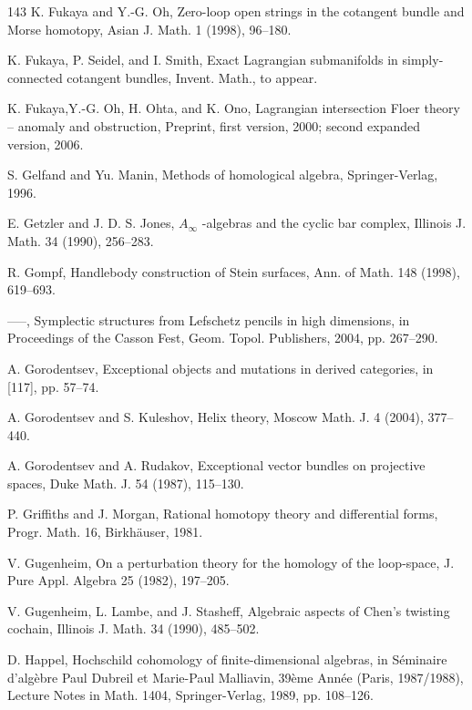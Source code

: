 \begin{thebibliography}{143}
 K. Fukaya and Y.-G. Oh, Zero-loop open strings in the cotangent bundle and Morse homotopy, Asian J. Math. 1 (1998), 96–180.

 K. Fukaya, P. Seidel, and I. Smith, Exact Lagrangian submanifolds in simply-connected cotangent bundles, Invent. Math., to appear.

 K. Fukaya,Y.-G. Oh, H. Ohta, and K. Ono, Lagrangian intersection Floer theory – anomaly and obstruction, Preprint, first version, 2000; second expanded version, 2006.

 S. Gelfand and Yu. Manin, Methods of homological algebra, Springer-Verlag, 1996.

 E. Getzler and J. D. S. Jones, \ensuremath{A_\infty} -algebras and the cyclic bar complex, Illinois J. Math. 34 (1990), 256–283.

 R. Gompf, Handlebody construction of Stein surfaces, Ann. of Math. 148 (1998), 619–693.

 —–, Symplectic structures from Lefschetz pencils in high dimensions, in Proceedings of the Casson Fest, Geom. Topol. Publishers, 2004, pp. 267–290.

 A. Gorodentsev, Exceptional objects and mutations in derived categories, in [117], pp. 57–74.

 A. Gorodentsev and S. Kuleshov, Helix theory, Moscow Math. J. 4 (2004), 377–440.

 A. Gorodentsev and A. Rudakov, Exceptional vector bundles on projective spaces, Duke Math. J. 54 (1987), 115–130.

 P. Griffiths and J. Morgan, Rational homotopy theory and differential forms, Progr. Math. 16, Birkhäuser, 1981.

 V. Gugenheim, On a perturbation theory for the homology of the loop-space, J. Pure Appl. Algebra 25 (1982), 197–205.

 V. Gugenheim, L. Lambe, and J. Stasheff, Algebraic aspects of Chen’s twisting cochain, Illinois J. Math. 34 (1990), 485–502.

 D. Happel, Hochschild cohomology of finite-dimensional algebras, in Séminaire d’algèbre Paul Dubreil et Marie-Paul Malliavin, 39ème Année (Paris, 1987/1988), Lecture Notes in Math. 1404, Springer-Verlag, 1989, pp. 108–126.


\end{thebibliography}

